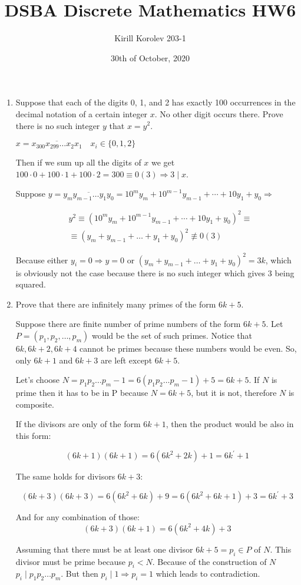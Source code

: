 \documentclass{article}
\title{DSBA Discrete Mathematics HW6}
\author{Kirill Korolev 203-1}
\date{30th of October, 2020}
\begin{document}
\maketitle

\begin{enumerate}
\item Suppose that each of the digits 0, 1, and 2 has exactly 100 occurrences in the decimal notation of a
certain integer $x$. No other digit occurs there. Prove there is no such integer $y$ that $x=y^2$.

$x = \overline{x_{300}x_{299}\ldots{}x_2x_1} \quad x_i \in \{0,1,2\}$

Then if we sum up all the digits of $x$ we get $100 \cdot 0 + 100 \cdot 1 + 100 \cdot 2 = 300 \equiv 0 (3) \Rightarrow 3 \mid x$. 

Suppose $y=\overline{y_my_{m-1}\ldots{}y_1y_0}=10^{m}y_m + 10^{m-1}y_{m-1} + \cdots{} + 10y_1 + y_0 \Rightarrow$

\begin{align*}
&y^2 \equiv (10^{m}y_m + 10^{m-1}y_{m-1} + \cdots{} + 10y_1 + y_0)^2 \equiv\\
&\equiv (y_m + y_{m-1} + \ldots{} + y_1 + y_0)^2 \not \equiv 0(3)
\end{align*}

Because either $y_i = 0 \Rightarrow y = 0$ or $(y_m + y_{m-1} + \ldots{} + y_1 + y_0)^2 = 3k$, which is obviously not the case because there is no such integer which gives $3$ being squared.

\item Prove that there are infinitely many primes of the form $6k + 5$.

Suppose there are finite number of prime numbers of the form $6k + 5$. Let $P = (p_1, p_2, \ldots{}, p_m)$ would be the set of such primes. Notice that $6k, 6k+2, 6k+4$ cannot be primes because these numbers would be even. So, only $6k+1$ and $6k + 3$ are left except $6k+5$. 

Let's choose $N = p_1p_2\ldots{}p_m - 1 = 6(p_1p_2\ldots{}p_m - 1)+5=6k+5$. If $N$ is prime then it has to be in P because $N=6k+5$, but it is not, therefore $N$ is composite. 

If the divisors are only of the form $6k + 1$, then the product would be also in this form:
 
\[(6k+1)(6k+1)=6(6k^2+2k)+1=6k^\prime+1\]

The same holds for divisors $6k+3$:

\[(6k+3)(6k+3)=6(6k^2+6k)+9=6(6k^2+6k+1)+3=6k^\prime+3\]

And for any combination of those:
\[(6k+3)(6k+1)=6(6k^2+4k)+3\]

Assuming that there must be at least one divisor $6k+5=p_i \in P$ of $N$. This divisor must be prime because $p_i < N$. Because of the construction of $N$ $p_i \mid p_1p_2\ldots{}p_m$. But then $p_i \mid 1 \Rightarrow p_i = 1$ which leads to contradiction.


\end{enumerate}
\end{document}
